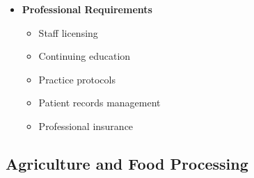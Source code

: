 \begin{tcolorbox}[
    colback=white,
    colframe=primarydark,
    title=\textbf{NAFDAC and Medical Requirements},
    before skip=1em,
    after skip=1em
]
\begin{itemize}[leftmargin=*,itemsep=0.5em]
        \item \textbf{Professional Requirements}
        \begin{itemize}[itemsep=0.3em]
            \item Staff licensing
            \item Continuing education
            \item Practice protocols
            \item Patient records management
            \item Professional insurance
        \end{itemize}
    \end{itemize}
\end{tcolorbox}

\subsection{Agriculture and Food Processing}\label{subsec:agriculture-compliance}
\vspace{1em}

